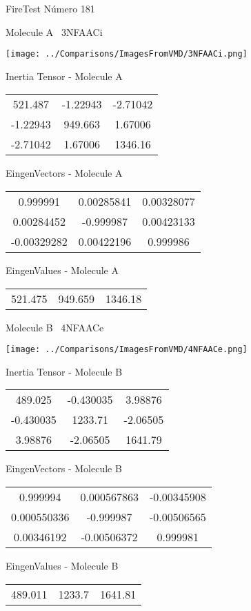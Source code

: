 \vtab[-3cm]
\begin{center}
{\large FireTest \tab Número 181}
\end{center}
\begin{multicols}{2}
\begin{center}

Molecule A \
3NFAACi

\texttt{[image: ../Comparisons/ImagesFromVMD/3NFAACi.png]}

Inertia Tensor - Molecule A \\
\begin{tabular}{|c c c|}
521.487	 & 	-1.22943	 & 	-2.71042	 \\
-1.22943	 & 	949.663	 & 	1.67006	 \\
-2.71042	 & 	1.67006	 & 	1346.16
\end{tabular}

\vtab
 EingenVectors - Molecule A     \\
\begin{tabular}{|c c c|}
0.999991	 & 	0.00285841	 & 	0.00328077	 \\
0.00284452	 & 	-0.999987	 & 	0.00423133	 \\
-0.00329282	 & 	0.00422196	 & 	0.999986
\end{tabular}

\vtab
 EingenValues - Molecule A     \\
\begin{tabular}{|c c c|}
521.475	 & 	949.659	 & 	1346.18	 \\
\end{tabular}
\columnbreak

Molecule B \
4NFAACe

\texttt{[image: ../Comparisons/ImagesFromVMD/4NFAACe.png]}

Inertia Tensor - Molecule B \\
\begin{tabular}{|c c c|}
489.025	 & 	-0.430035	 & 	3.98876	 \\
-0.430035	 & 	1233.71	 & 	-2.06505	 \\
3.98876	 & 	-2.06505	 & 	1641.79
\end{tabular}

\vtab
 EingenVectors - Molecule B     \\
\begin{tabular}{|c c c|}
0.999994	 & 	0.000567863	 & 	-0.00345908	 \\
0.000550336	 & 	-0.999987	 & 	-0.00506565	 \\
0.00346192	 & 	-0.00506372	 & 	0.999981
\end{tabular}

\vtab
 EingenValues - Molecule B     \\
\begin{tabular}{|c c c|}
489.011	 & 	1233.7	 & 	1641.81	 \\
\end{tabular}

\end{center}
\end{multicols}

